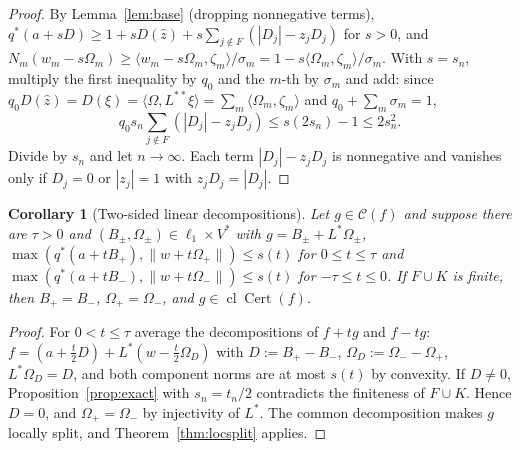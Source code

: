 \documentclass[10pt]{amsart}
\newtheorem{corollary}[theorem]{Corollary}
\theoremstyle{definition}
\theoremstyle{remark}
\newcommand{\Cset}{\mathcal C}
\newcommand{\Cert}{\operatorname{Cert}}
\newcommand{\cl}{\operatorname{cl}}
\newcommand{\zh}{\hat z}
\newcommand{\ip}[2]{\langle #1,#2\rangle}
\begin{document}
\begin{proof}
By Lemma~\ref{lem:base} (dropping nonnegative terms),
$q^*(a+sD)\ge1+sD(\zh)+s\sum_{j\notin F}(|D_j|-z_jD_j)$ for $s>0$, and
$N_m(w_m-s\Omega_m)\ge\ip{w_m-s\Omega_m}{\zeta_m}/\sigma_m=1-s\ip{\Omega_m}
{\zeta_m}/\sigma_m$.  With $s=s_n$, multiply the first inequality by $q_0$
and the $m$-th by $\sigma_m$ and add: since $q_0D(\zh)=D(\xi)=\ip{\Omega}
{L^{**}\xi}=\sum_m\ip{\Omega_m}{\zeta_m}$ and $q_0+\sum_m\sigma_m=1$,
\[
 q_0s_n\sum_{j\notin F}(|D_j|-z_jD_j)\le s(2s_n)-1\le2s_n^2 .
\]
Divide by $s_n$ and let $n\to\infty$.  Each term $|D_j|-z_jD_j$ is
nonnegative and vanishes only if $D_j=0$ or $|z_j|=1$ with $z_jD_j=|D_j|$.
\end{proof}

\begin{corollary}[Two-sided linear decompositions]\label{cor:twosided}
Let $g\in\Cset(f)$ and suppose there are $\tau>0$ and
$(B_\pm,\Omega_\pm)\in\ell_1\times V^*$ with $g=B_\pm+L^*\Omega_\pm$,
$\max(q^*(a+tB_+),\|w+t\Omega_+\|)\le s(t)$ for $0\le t\le\tau$ and
$\max(q^*(a+tB_-),\|w+t\Omega_-\|)\le s(t)$ for $-\tau\le t\le0$.  If
$F\cup K$ is finite, then $B_+=B_-$, $\Omega_+=\Omega_-$, and
$g\in\cl\Cert(f)$.
\end{corollary}

\begin{proof}
For $0<t\le\tau$ average the decompositions of $f+tg$ and $f-tg$:
$f=(a+\frac t2D)+L^*(w-\frac t2\Omega_D)$ with $D:=B_+-B_-$,
$\Omega_D:=\Omega_--\Omega_+$, $L^*\Omega_D=D$, and both component norms are
at most $s(t)$ by convexity.  If $D\ne0$, Proposition~\ref{prop:exact} with
$s_n=t_n/2$ contradicts the finiteness of $F\cup K$.  Hence $D=0$, and
$\Omega_+=\Omega_-$ by injectivity of $L^*$.  The common decomposition makes
$g$ locally split, and Theorem~\ref{thm:locsplit} applies.
\end{proof}
\end{document}
